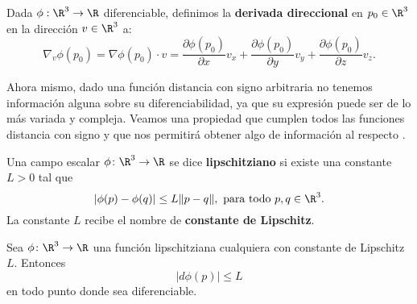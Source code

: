 \begin{definicion}
  Dada $\phi:\R^3\to \R$ diferenciable, definimos la \textbf{derivada direccional} en $p_0\in \R^3$ en la dirección $v\in\R^3$ a:
  \begin{equation*}
    \nabla_v \phi(p_0) = \nabla \phi(p_0) \cdot v = \frac{\partial{\phi}(p_0)}{\partial{x}}v_x + \frac{\partial{\phi}(p_0)}{\partial{y}}v_y + \frac{\partial{\phi}(p_0)}{\partial{z}}v_z.
  \end{equation*}
\end{definicion}




Ahora mismo, dado una función distancia con signo arbitraria no tenemos información alguna sobre su diferenciabilidad, ya que su expresión puede ser de lo más variada y compleja. Veamos una propiedad que cumplen todos las funciones distancia con signo y que nos permitirá obtener algo de información al respecto \cite{lips,derivWiki}.

\begin{definicion}
    Una campo escalar $\phi\colon \R^3 \to \R$ se dice \textbf{lipschitziano} si existe una constante $L>0$ tal que
    \begin{equation*}
        \vert \phi(p)-\phi(q)\vert \le L\Vert p-q\Vert,\ \text{para todo } p,q\in \R^3.
    \end{equation*}
    La constante $L$ recibe el nombre de \textbf{constante de Lipschitz}.
\end{definicion}

\begin{proposicion}
    Sea $\phi\colon \R^3 \to \R$ una función lipschitziana cualquiera con constante de Lipschitz $L$. Entonces
    \begin{equation*}
        \vert d\phi(p)\vert \le L
    \end{equation*}
    en todo punto donde sea diferenciable.
\end{proposicion}

